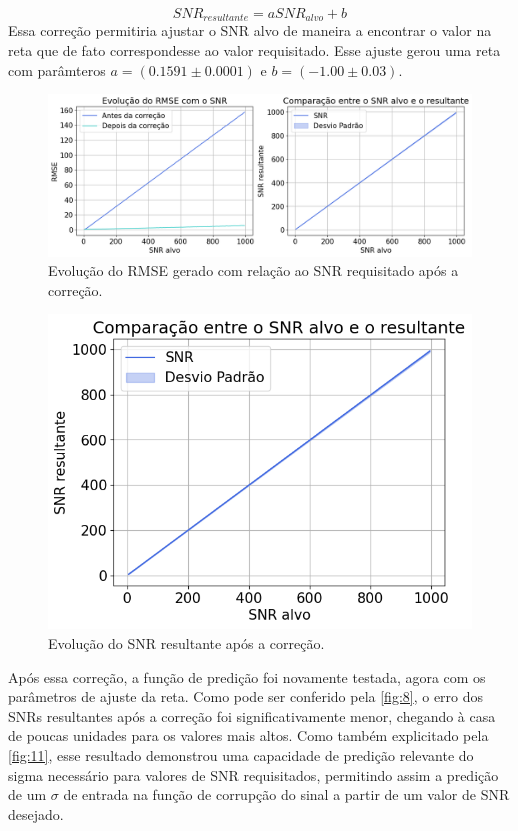 \documentclass[12pt]{article}
\begin{document}
\begin{equation} \label{eq:12}
    SNR_{resultante} = a SNR_{alvo} + b    
\end{equation}
Essa correção permitiria ajustar o SNR alvo de maneira a encontrar o valor na reta que de 
fato correspondesse ao valor requisitado. Esse ajuste gerou uma reta com parâmteros 
$a = (0.1591 \pm 0.0001)$ e $b = (-1.00 \pm 0.03)$.
\begin{figure} [H]
    \includegraphics[scale=0.5]{evolucao-rmse.png}
    \centering
    \caption{Evolução do RMSE gerado com relação ao SNR requisitado após a correção.}
    \label{fig:8}
\end{figure}

\begin{figure} [H]
    \includegraphics[scale=0.5]{SNR_pos_correcao.png}
    \centering
    \caption{Evolução do SNR resultante após a correção.}
    \label{fig:11}
\end{figure}

Após essa correção, a função de predição foi novamente testada, agora com os parâmetros de ajuste da reta.
Como pode ser conferido pela \autoref{fig:8}, o erro dos SNRs resultantes após a correção foi 
significativamente menor, chegando à casa de poucas unidades para os valores mais altos. Como também explicitado pela \autoref{fig:11}, esse resultado 
demonstrou uma capacidade de predição relevante do sigma necessário para valores de SNR requisitados, permitindo assim 
a predição de um $\sigma$ de entrada na função de corrupção do sinal a partir de um valor de SNR desejado. 
\end{document}
